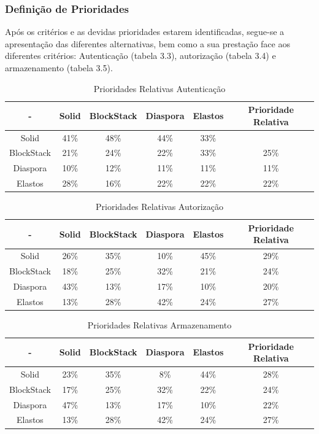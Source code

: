 \pagebreak

\subsubsection{Definição de Prioridades}
Após os critérios e as devidas prioridades estarem identificadas, segue-se a apresentação das diferentes alternativas, bem como a sua prestação face aos diferentes critérios: Autenticação (tabela 3.3), autorização (tabela 3.4) e armazenamento (tabela 3.5). 

\begin{table}[h]
\centering
\caption{Prioridades Relativas Autenticação}
\vspace{0.5cm}
\begin{tabular}{c|c|c|c|c|c} 
 - & Solid & BlockStack & Diaspora & Elastos & Prioridade Relativa \\
\hline                               
Solid & 41\% &	48\% &	44\% & 33\% \\
BlockStack &  21\% & 24\% &	22\% &	33\% &	25\% \\
Diaspora &  10\% &	12\% &	11\% & 11\%	& 11\% \\
Elastos & 28\% & 16\% & 22\% & 22\% & 22\% \\
\end{tabular}
\end{table}

\begin{table}[h]
\centering
\caption{Prioridades Relativas Autorização}
\vspace{0.5cm}
\begin{tabular}{c|c|c|c|c|c} 
 - & Solid & BlockStack & Diaspora & Elastos & Prioridade Relativa \\
\hline                               
Solid & 26\% &	35\% &	10\% & 45\% & 29\% \\
BlockStack &  18\% & 25\% & 32\% & 21\% & 24\% \\
Diaspora &  43\% &	13\% &	17\% &	10\% & 20\% \\
Elastos & 13\% & 28\% &	42\% & 24\% & 27\% \\
\end{tabular}
\end{table}

\begin{table}[h]
\centering
\caption{Prioridades Relativas Armazenamento}
\vspace{0.5cm}
\begin{tabular}{c|c|c|c|c|c} 
 - & Solid & BlockStack & Diaspora & Elastos & Prioridade Relativa \\
\hline                               
Solid & 23\% & 35\% & 8\% & 44\% & 28\% \\
BlockStack &  17\% & 25\%	& 32\%	& 22\%	& 24\% \\
Diaspora &  47\% &	13\% & 17\%	& 10\% & 22\% \\
Elastos & 13\% & 28\% & 42\% & 24\% & 27\% \\
\end{tabular}
\end{table}

